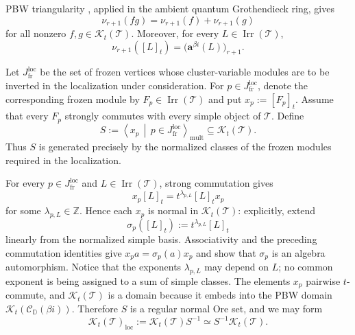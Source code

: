 \documentclass[12pt, reqno]{amsart}
\theoremstyle{plain}
\theoremstyle{definition}
\numberwithin{equation}{section}
\newcommand{\ZZ}{\mathbb{Z}}
\newcommand{\DD}{\mathbb{D}}
\begin{document}
PBW triangularity
\cite[Lemma~5.5]{oh2025pbw}, applied in the ambient quantum
Grothendieck ring, gives
\begin{equation}\label{eq:PBW-last-coordinate-multiplicativity}
    \nu_{r+1}(fg)
    =
    \nu_{r+1}(f)+\nu_{r+1}(g)
\end{equation}
for all nonzero
\(f,g\in\mathcal K_t(\mathscr T)\). Moreover, for every
\(L\in\operatorname{Irr}(\mathscr T)\),
\begin{equation}\label{eq:PBW-degree-simple-class}
    \nu_{r+1}([L]_t)
    =
    \bigl(\mathbf a^{\beta i}(L)\bigr)_{r+1}.
\end{equation}

Let \(J_{\mathrm{fr}}^{\mathrm{loc}}\) be the set of frozen vertices
whose cluster-variable modules are to be inverted in the
localization under consideration. For
\(p\in J_{\mathrm{fr}}^{\mathrm{loc}}\), denote the corresponding
frozen module by
\(
    F_p\in\operatorname{Irr}(\mathscr T)
\)
and put \(x_p:=[F_p]_t\). Assume that every \(F_p\) strongly commutes
with every simple object of \(\mathscr T\). Define
\begin{equation}\label{eq:frozen-Ore-set}
    S
    :=
    \left\langle
        x_p
        \,\middle|\,
        p\in J_{\mathrm{fr}}^{\mathrm{loc}}
    \right\rangle_{\mathrm{mult}}
    \subseteq\mathcal K_t(\mathscr T).
\end{equation}
Thus \(S\) is generated precisely by the normalized classes of the
frozen modules required in the localization.

For every \(p\in J_{\mathrm{fr}}^{\mathrm{loc}}\) and
\(L\in\operatorname{Irr}(\mathscr T)\), strong commutation gives
\[
    x_p[L]_t
    =
    t^{\lambda_{p,L}}[L]_t x_p
\]
for some \(\lambda_{p,L}\in\ZZ\). Hence each \(x_p\) is normal in
\(\mathcal K_t(\mathscr T)\): explicitly, extend
\[
    \sigma_p([L]_t):=t^{\lambda_{p,L}}[L]_t
\]
linearly from the normalized simple basis. Associativity and the
preceding commutation identities give
\(x_pa=\sigma_p(a)x_p\) and show that \(\sigma_p\) is an algebra
automorphism. Notice that the exponents
\(\lambda_{p,L}\) may depend on \(L\); no common exponent is being
assigned to a sum of simple classes. The elements \(x_p\) pairwise
\(t\)-commute, and
\(\mathcal K_t(\mathscr T)\) is a domain because it embeds into the
PBW domain
\(\mathcal K_t(\mathscr C_{\DD}(\beta i))\). Therefore \(S\) is a
regular normal Ore set, and we may form
\[
    \mathcal K_t(\mathscr T)_{\mathrm{loc}}
    :=
    \mathcal K_t(\mathscr T)S^{-1}
    \simeq
    S^{-1}\mathcal K_t(\mathscr T).
\]
\end{document}
